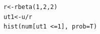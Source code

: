 \documentclass[letterpaper]{article}
\begin{document}
\begin{enumerate}
\begin{enumerate}
\begin{verbatim}
r<-rbeta(1,2,2)
ut1<-u/r
hist(num[ut1 <=1], prob=T)
\end{verbatim}



\end{enumerate}


\end{enumerate}
\end{document}

